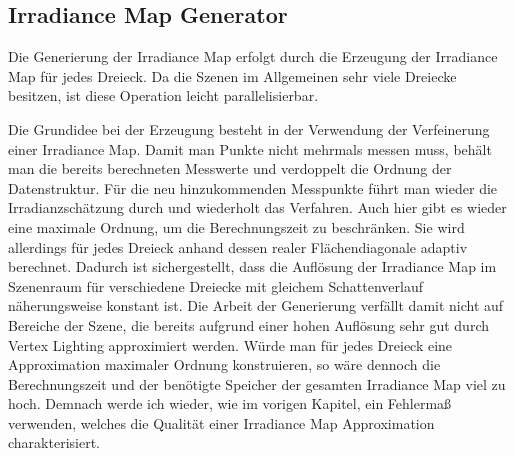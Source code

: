 
	\subsection{Irradiance Map Generator} %
	\label{sub:irradiance_map_generator}

		Die Generierung der Irradiance Map erfolgt durch die Erzeugung der Irradiance Map für jedes Dreieck.
		Da die Szenen im Allgemeinen sehr viele Dreiecke besitzen, ist diese Operation leicht parallelisierbar.

		Die Grundidee bei der Erzeugung besteht in der Verwendung der Verfeinerung einer Irradiance Map.
		Damit man Punkte nicht mehrmals messen muss, behält man die bereits berechneten Messwerte und verdoppelt die Ordnung der Datenstruktur.
		Für die neu hinzukommenden Messpunkte führt man wieder die Irradianzschätzung durch und wiederholt das Verfahren.
		Auch hier gibt es wieder eine maximale Ordnung, um die Berechnungszeit zu beschränken.
		Sie wird allerdings für jedes Dreieck anhand dessen realer Flächendiagonale adaptiv berechnet.
		Dadurch ist sichergestellt, dass die Auflösung der Irradiance Map im Szenenraum für verschiedene Dreiecke mit gleichem Schattenverlauf näherungsweise konstant ist.
		Die Arbeit der Generierung verfällt damit nicht auf Bereiche der Szene, die bereits aufgrund einer hohen Auflösung sehr gut durch Vertex Lighting approximiert werden.
		Würde man für jedes Dreieck eine Approximation maximaler Ordnung konstruieren, so wäre dennoch die Berechnungszeit und der benötigte Speicher der gesamten Irradiance Map viel zu hoch.
		Demnach werde ich wieder, wie im vorigen Kapitel, ein Fehlermaß verwenden, welches die Qualität einer Irradiance Map Approximation charakterisiert.


